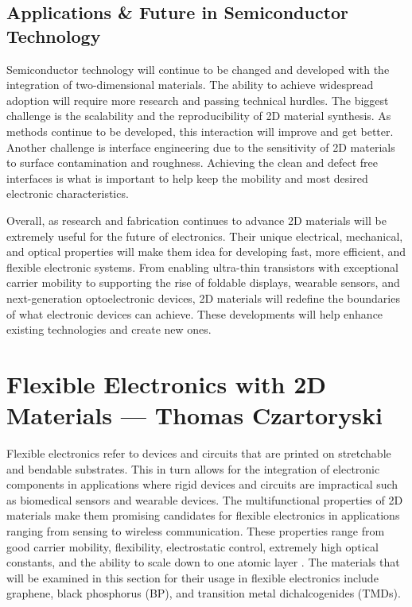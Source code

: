 \documentclass[conference]{IEEEtran}
\begin{document}
\subsection{Applications \& Future in Semiconductor Technology}

Semiconductor technology will continue to be changed and developed with the integration of two-dimensional materials. The ability to achieve widespread adoption will require more research and passing technical hurdles. The biggest challenge is the scalability and the reproducibility of 2D material synthesis. As methods continue to be developed, this interaction will improve and get better. Another challenge is interface engineering due to the sensitivity of 2D materials to surface contamination and roughness. Achieving the clean and defect free interfaces is what is important to help keep the mobility and most desired electronic characteristics. 

Overall, as research and fabrication continues to advance 2D materials will be extremely useful for the future of electronics. Their unique electrical, mechanical, and optical properties will make them idea for developing fast, more efficient, and flexible electronic systems. From enabling ultra-thin transistors with exceptional carrier mobility to supporting the rise of foldable displays, wearable sensors, and next-generation optoelectronic devices, 2D materials will redefine the boundaries of what electronic devices can achieve. These developments will help enhance existing technologies and create new ones.

\section{Flexible Electronics with 2D Materials — Thomas Czartoryski}

Flexible electronics refer to devices and circuits that are printed on stretchable and bendable substrates. This in turn allows for the integration of electronic components in applications where rigid devices and circuits are impractical such as biomedical sensors and wearable devices. The multifunctional properties of 2D materials make them promising candidates for flexible electronics in applications ranging from sensing to wireless communication. These properties range from good carrier mobility, flexibility, electrostatic control, extremely high optical constants, and the ability to scale down to one atomic layer \cite{tc1}. The materials that will be examined in this section for their usage in flexible electronics include graphene, black phosphorus (BP), and transition metal dichalcogenides (TMDs).
\end{document}
